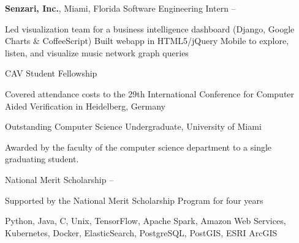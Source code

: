 \documentclass[letterpaper,MMMyyyy,nonstopmode]{simpleresumecv}
\begin{document}
\begin{Body}
\Entry
\textbf{Senzari, Inc.}, Miami, Florida
\Gap
\BulletItem
Software Engineering Intern
\hfill
{} -- 
\begin{Detail}
\SubBulletItem Led visualization team for a business intelligence dashboard (Django, Google Charts \& CoffeeScript)
\SubBulletItem Built webapp in HTML5/jQuery Mobile to explore, listen, and visualize music network graph queries
\end{Detail}



\Gap
\BulletItem CAV Student Fellowship
\hfill
{}
\begin{Detail}
\Item Covered attendance costs to the 29th International Conference for Computer Aided Verification in Heidelberg, Germany
\end{Detail}

\Gap
\BulletItem Outstanding Computer Science Undergraduate, University of Miami
\hfill
{}
\begin{Detail}
\Item Awarded by the faculty of the computer science department to a single graduating student.
\end{Detail}

\Gap
\BulletItem National Merit Scholarship
\hfill
{} -- 
\begin{Detail}
\Item Supported by the National Merit Scholarship Program for four years
\end{Detail}


\Entry Python, Java, C, Unix, TensorFlow, Apache Spark, Amazon Web Services, Kubernetes, Docker, ElasticSearch, PostgreSQL, PostGIS, ESRI ArcGIS

\end{Body}
\end{document}
